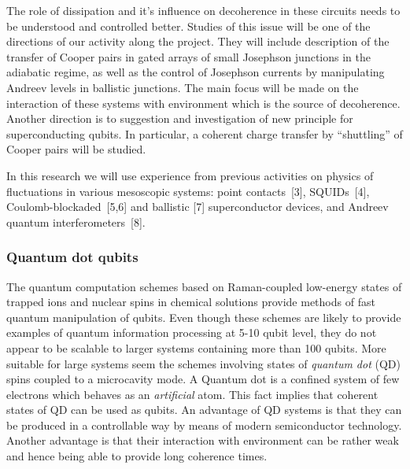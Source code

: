 The role of dissipation and it's influence on decoherence in these
circuits needs to be understood and  controlled better. Studies of
this issue will be one of the directions of our activity along the
project. They will  include description of the transfer of Cooper
pairs in gated arrays of small Josephson junctions in the  adiabatic
regime, as well as the control of Josephson currents by manipulating
Andreev levels in ballistic  junctions. The main focus will be made on
the interaction of these systems with environment which is the  source
of decoherence. Another direction is to suggestion and investigation
of new principle for superconducting qubits. In particular, a
coherent charge transfer by ``shuttling'' of  Cooper pairs will be
studied.

In this research we will use experience from previous activities on
physics of fluctuations in various mesoscopic systems: point
contacts~[3], SQUIDs~[4], Coulomb-blockaded~[5,6]
and ballistic [7] superconductor devices, and  Andreev quantum
interferometers~[8].


\subsubsection{Quantum dot qubits}

The quantum computation schemes based on Raman-coupled low-energy
states of trapped ions and nuclear spins in chemical solutions provide
methods of fast quantum manipulation of qubits. Even though these
schemes are likely to provide examples of quantum information
processing at 5-10 qubit level, they do not appear to be scalable to
larger systems containing more than 100 qubits. More suitable for
large systems seem the schemes involving states of {\sl quantum dot}
(QD) spins coupled to a microcavity mode. A Quantum dot is a confined
system of few electrons which behaves as an {\sl artificial}
atom. This fact implies that coherent states of QD can be used as
qubits. An advantage of QD systems is that they can be produced in a
controllable way by means of modern semiconductor technology. Another
advantage is that their interaction with environment can be rather weak 
and hence being able to provide long coherence times.


